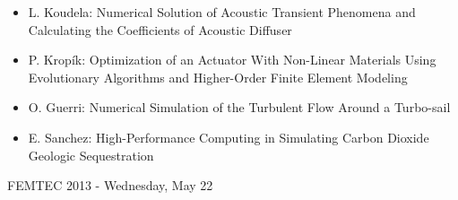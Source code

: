 \documentclass[10pt, A4]{article}%
\begin{document}
\begin{itemize}
\begin{itemize}
    \item {L. Koudela}: {Numerical Solution of Acoustic Transient Phenomena and Calculating the Coefficients of Acoustic Diffuser}
    \item {P. Kropík}: {Optimization of an Actuator With Non-Linear Materials Using Evolutionary Algorithms and Higher-Order Finite Element Modeling}
    \item {O. Guerri}: {Numerical Simulation of the Turbulent Flow Around a Turbo-sail}
    \item {E. Sanchez}: {High-Performance Computing in Simulating Carbon Dioxide Geologic Sequestration}
  \end{itemize}
   
\end{itemize}

\newpage

\centerline{\huge FEMTEC 2013 - Wednesday, May 22}
\vspace{4mm}
\end{document}
